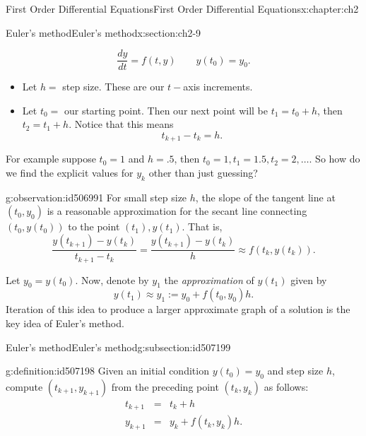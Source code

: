 \documentclass[oneside,10pt,]{book}
\numberwithin{equation}{section}
\numberwithin{equation}{section}
\newcommand{\amp}{&}
\begin{document}
\begin{chapterptx}{First Order Differential Equations}{}{First Order Differential Equations}{}{}{x:chapter:ch2}
\begin{sectionptx}{Euler's method}{}{Euler's method}{}{}{x:section:ch2-9}
\begin{introduction}{}
\begin{equation*}
\frac{dy}{dt}=f(t,y)\qquad y(t_{0})=y_{0}.
\end{equation*}
%
%
\begin{itemize}[label=\textbullet]
\item{}Let \(h=\) step size. These are our \(t-\)axis increments.%
\item{}Let \(t_{0}=\) our starting point. Then our next point will be \(t_{1}=t_{0}+h\), then \(t_{2}=t_{1}+h\). Notice that this means%
\begin{equation*}
t_{k+1} - t_k = h.
\end{equation*}
%
\end{itemize}
For example suppose \(t_{0}=1\) and \(h=.5\), then \(t_{0}=1,t_{1}=1.5,t_{2}=2,\dots\). So how do we find the explicit values for \(y_{k}\) other than just guessing?%
\begin{observation}{}{g:observation:id506991}%
For small step size \(h\), the slope of the tangent line at \((t_0, y_0)\) is a reasonable approximation for the secant line connecting \((t_0, y(t_0))\) to the point \((t_1), y(t_1)\). That is,%
\begin{equation*}
\frac{y(t_{k+1}) - y(t_k)}{t_{k+1} - t_k} = \frac{y(t_{k+1}) - y(t_k)}{h} \approx f(t_k, y(t_k)).
\end{equation*}
\end{observation}
Let \(y_0 = y(t_0)\). Now, denote by \(y_1\) the \emph{approximation} of \(y(t_1)\) given by%
\begin{equation*}
y(t_1) \approx y_1 := y_0 + f(t_0, y_0) h.
\end{equation*}
Iteration of this idea to produce a larger approximate graph of a solution is the key idea of Euler's method.%
\end{introduction}%
%
%
\typeout{************************************************}
\typeout{************************************************}
%
\begin{subsectionptx}{Euler's method}{}{Euler's method}{}{}{g:subsection:id507199}
\begin{definition}{}{g:definition:id507198}%
Given an initial condition \(y(t_{0})=y_{0}\) and step size \(h\), compute \(\left(t_{k+1},y_{k+1}\right)\) from the preceding point \((t_{k},y_{k})\) as follows:%
\begin{align*}
t_{k+1} \amp = \amp t_{k}+h\\
y_{k+1} \amp = \amp y_{k}+f\left(t_{k},y_{k}\right)h.
\end{align*}

\end{definition}
\end{subsectionptx}
\end{sectionptx}
\end{chapterptx}
\end{document}
